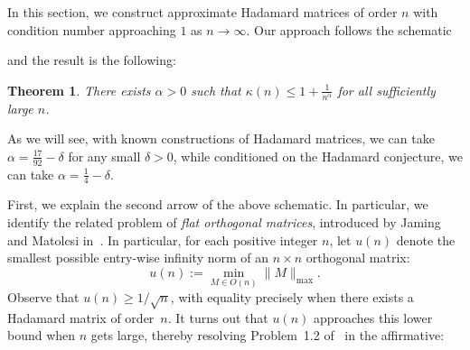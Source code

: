 \documentclass[11pt]{article}
\theoremstyle{plain}
\newtheorem{theorem}{Theorem}
\theoremstyle{definition}
\begin{document}
In this section, we construct approximate Hadamard matrices of order $n$ with condition number approaching $1$ as $n\to\infty$.
Our approach follows the schematic
\begin{center}
\end{center}
and the result is the following:

\begin{theorem}
\label{thm.main result}
There exists $\alpha>0$ such that $\displaystyle \kappa(n)\leq1+\frac{1}{n^\alpha}$ for all sufficiently large $n$.
\end{theorem}

As we will see, with known constructions of Hadamard matrices, we can take $\alpha=\frac{17}{92}-\delta$ for any small $\delta>0$, while conditioned on the Hadamard conjecture, we can take $\alpha=\frac{1}{4}-\delta$.

First, we explain the second arrow of the above schematic.
In particular, we identify the related problem of \textit{flat orthogonal matrices}, introduced by Jaming and Matolcsi in~\cite{JamingM:15}.
In particular, for each positive integer $n$, let $u(n)$ denote the smallest possible entry-wise infinity norm of an $n\times n$ orthogonal matrix:
\[
u(n)
:=\min_{M\in O(n)}\|M\|_{\max}.
\]
Observe that $u(n)\geq 1/\sqrt{n}$, with equality precisely when there exists a Hadamard matrix of order~$n$.
It turns out that $u(n)$ approaches this lower bound when $n$ gets large, thereby resolving Problem~1.2 of~\cite{JamingM:15} in the affirmative:
\end{document}
